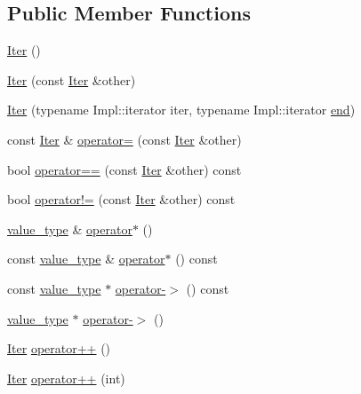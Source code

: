 \subsection*{Public Member Functions}
\begin{DoxyCompactItemize}
\item 
\hyperlink{classtheoria_1_1util_1_1densemap_1_1Iter_addc26bfe85f24fe8bcdde3846275901f}{Iter} ()
\item 
\hyperlink{classtheoria_1_1util_1_1densemap_1_1Iter_a750c06e8ecf8f5200e0bb8685d385e13}{Iter} (const \hyperlink{classtheoria_1_1util_1_1densemap_1_1Iter}{Iter} \&other)
\item 
\hyperlink{classtheoria_1_1util_1_1densemap_1_1Iter_a796e7241e62ebbfbb3e87db3495e0672}{Iter} (typename Impl\+::iterator iter, typename Impl\+::iterator \hyperlink{classtheoria_1_1util_1_1densemap_a2aebd517ccb28817684c62afc67396f3}{end})
\item 
const \hyperlink{classtheoria_1_1util_1_1densemap_1_1Iter}{Iter} \& \hyperlink{classtheoria_1_1util_1_1densemap_1_1Iter_a94ae1002beb5e2749b842b01f1e40a97}{operator=} (const \hyperlink{classtheoria_1_1util_1_1densemap_1_1Iter}{Iter} \&other)
\item 
bool \hyperlink{classtheoria_1_1util_1_1densemap_1_1Iter_a70b1de08a54e34afd57cce65d093eecb}{operator==} (const \hyperlink{classtheoria_1_1util_1_1densemap_1_1Iter}{Iter} \&other) const
\item 
bool \hyperlink{classtheoria_1_1util_1_1densemap_1_1Iter_a3b85c5cb2f068ade9fcf8c8547aacea3}{operator!=} (const \hyperlink{classtheoria_1_1util_1_1densemap_1_1Iter}{Iter} \&other) const
\item 
\hyperlink{classtheoria_1_1util_1_1densemap_1_1Iter_a8a1cedbd37c4faee8284d6f1debd49f2}{value\+\_\+type} \& \hyperlink{classtheoria_1_1util_1_1densemap_1_1Iter_ae290045c043b2c9ea6ff17a91217cb04}{operator$\ast$} ()
\item 
const \hyperlink{classtheoria_1_1util_1_1densemap_1_1Iter_a8a1cedbd37c4faee8284d6f1debd49f2}{value\+\_\+type} \& \hyperlink{classtheoria_1_1util_1_1densemap_1_1Iter_ae2865858e0d4e2e8b946b3c3eabe2767}{operator$\ast$} () const
\item 
const \hyperlink{classtheoria_1_1util_1_1densemap_1_1Iter_a8a1cedbd37c4faee8284d6f1debd49f2}{value\+\_\+type} $\ast$ \hyperlink{classtheoria_1_1util_1_1densemap_1_1Iter_af31574e922ff523a77166683a1f12249}{operator-\/$>$} () const
\item 
\hyperlink{classtheoria_1_1util_1_1densemap_1_1Iter_a8a1cedbd37c4faee8284d6f1debd49f2}{value\+\_\+type} $\ast$ \hyperlink{classtheoria_1_1util_1_1densemap_1_1Iter_acf52921e292fe9aea8383a810dc54aa3}{operator-\/$>$} ()
\item 
\hyperlink{classtheoria_1_1util_1_1densemap_1_1Iter}{Iter} \hyperlink{classtheoria_1_1util_1_1densemap_1_1Iter_a484492c01c0db1a25dc4e475d99ba82f}{operator++} ()
\item 
\hyperlink{classtheoria_1_1util_1_1densemap_1_1Iter}{Iter} \hyperlink{classtheoria_1_1util_1_1densemap_1_1Iter_aa31a8c83fd8fefd48b6d43b778acbee5}{operator++} (int)
\end{DoxyCompactItemize}


